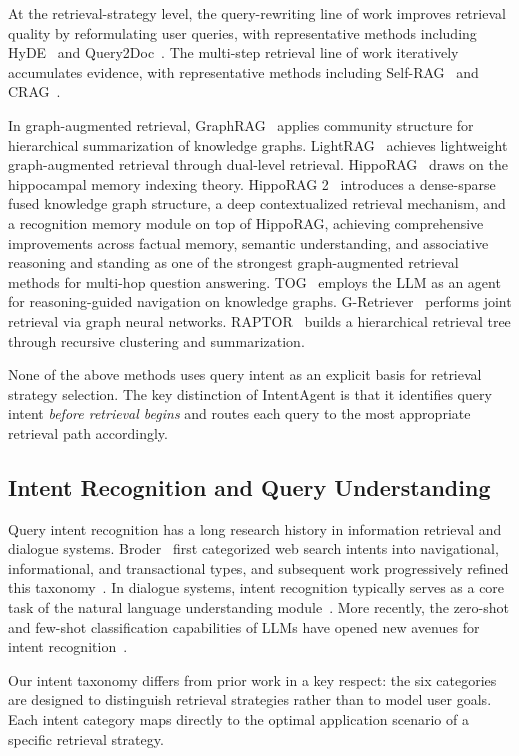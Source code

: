 \documentclass[runningheads]{llncs}
\begin{document}
At the retrieval-strategy level, the query-rewriting line of work improves retrieval quality by reformulating user queries, with representative methods including HyDE~\cite{ref4} and Query2Doc~\cite{ref5}. The multi-step retrieval line of work iteratively accumulates evidence, with representative methods including Self-RAG~\cite{ref6} and CRAG~\cite{ref7}.

In graph-augmented retrieval, GraphRAG~\cite{ref27} applies community structure for hierarchical summarization of knowledge graphs. LightRAG~\cite{ref26} achieves lightweight graph-augmented retrieval through dual-level retrieval. HippoRAG~\cite{ref28} draws on the hippocampal memory indexing theory. HippoRAG 2~\cite{ref30} introduces a dense-sparse fused knowledge graph structure, a deep contextualized retrieval mechanism, and a recognition memory module on top of HippoRAG, achieving comprehensive improvements across factual memory, semantic understanding, and associative reasoning and standing as one of the strongest graph-augmented retrieval methods for multi-hop question answering. TOG~\cite{ref24} employs the LLM as an agent for reasoning-guided navigation on knowledge graphs. G-Retriever~\cite{ref25} performs joint retrieval via graph neural networks. RAPTOR~\cite{ref23} builds a hierarchical retrieval tree through recursive clustering and summarization.

None of the above methods uses query intent as an explicit basis for retrieval strategy selection. The key distinction of IntentAgent is that it identifies query intent \emph{before retrieval begins} and routes each query to the most appropriate retrieval path accordingly.

\subsection{Intent Recognition and Query Understanding}

Query intent recognition has a long research history in information retrieval and dialogue systems. Broder~\cite{ref8} first categorized web search intents into navigational, informational, and transactional types, and subsequent work progressively refined this taxonomy~\cite{ref9,ref10}. In dialogue systems, intent recognition typically serves as a core task of the natural language understanding module~\cite{ref11}. More recently, the zero-shot and few-shot classification capabilities of LLMs have opened new avenues for intent recognition~\cite{ref12}.

Our intent taxonomy differs from prior work in a key respect: the six categories are designed to distinguish retrieval strategies rather than to model user goals. Each intent category maps directly to the optimal application scenario of a specific retrieval strategy.
\end{document}
